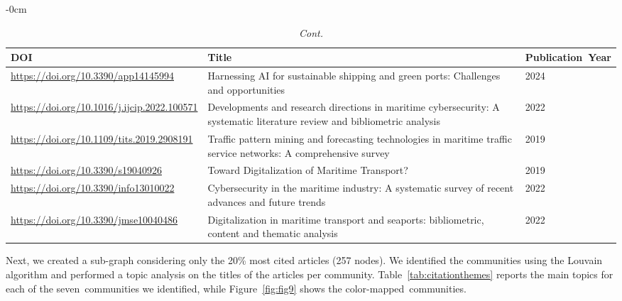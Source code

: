 \documentclass[jmse,review,accept,pdftex,moreauthors]{Definitions/mdpi}
\begin{document}
\begin{table}[H]\ContinuedFloat

\caption{{\em Cont.}}

\begin{adjustwidth}{-\extralength}{0cm}
	\begin{tabularx}{\fulllength}{XXp{2.7cm}}
		\toprule
		\textbf{DOI} & \textbf{Title} & \textbf{Publication~Year}\\
		\midrule
			
		\url{https://doi.org/10.3390/app14145994} & Harnessing AI for sustainable shipping and green ports: Challenges and opportunities & 2024\\
		\url{https://doi.org/10.1016/j.ijcip.2022.100571} & Developments and research directions in maritime cybersecurity: A systematic literature review and bibliometric analysis & 2022\\
		\url{https://doi.org/10.1109/tits.2019.2908191} & Traffic pattern mining and forecasting technologies in maritime traffic service networks: A comprehensive survey & 2019\\
		\url{https://doi.org/10.3390/s19040926} & Toward Digitalization of Maritime Transport? & 2019\\
		\url{https://doi.org/10.3390/info13010022} & Cybersecurity in the maritime industry: A systematic survey of recent advances and future trends & 2022\\
		\url{https://doi.org/10.3390/jmse10040486} & Digitalization in maritime transport and seaports: bibliometric, content and thematic analysis & 2022\\
		\bottomrule
	\end{tabularx}
\end{adjustwidth}
	\label{tab:citationtoppapers}
\end{table}



Next, we created a sub-graph considering only the 20\% most cited articles (257 nodes). We identified the communities using the Louvain algorithm and performed a topic analysis on the titles of the articles per community. Table~\ref{tab:citationthemes} reports the main topics for each of the seven~communities we identified, while Figure~\ref{fig:fig9} shows the color-mapped~communities.
\end{document}
